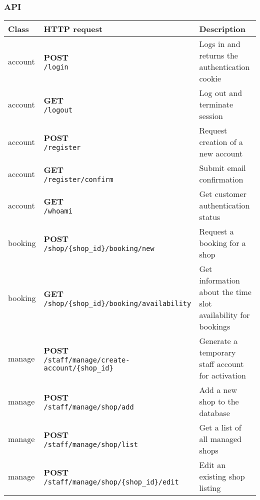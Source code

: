 \subsubsection{API}


\begin{tabularx}{\textwidth}{|p{}|l|X|} \hline
\textbf{Class} & \textbf{HTTP request} & \textbf{Description} \\\hline\endhead
account & \makecell{\textbf{POST} \\ \texttt{/login}}  & Logs in and returns the authentication  cookie \\\hline
account & \makecell{\textbf{GET} \\ \texttt{/logout}}  & Log out and terminate session \\\hline
account & \makecell{\textbf{POST} \\ \texttt{/register}}  & Request creation of a new account \\\hline
account & \makecell{\textbf{GET} \\ \texttt{/register/confirm}}  & Submit email confirmation \\\hline
account & \makecell{\textbf{GET} \\ \texttt{/whoami}}  & Get customer authentication status \\\hline
booking & \makecell{\textbf{POST} \\ \texttt{/shop/\{shop\_id\}/booking/new}}  & Request a booking for a shop \\\hline
booking & \makecell{\textbf{GET} \\ \texttt{/shop/\{shop\_id\}/booking/availability}}  & Get information about the time slot availability for bookings \\\hline
manage & \makecell{\textbf{POST} \\ \texttt{/staff/manage/create-account/\{shop\_id\}}}  & Generate a temporary staff account for activation \\\hline
manage & \makecell{\textbf{POST} \\ \texttt{/staff/manage/shop/add}}  & Add a new shop to the database \\\hline
manage & \makecell{\textbf{POST} \\ \texttt{/staff/manage/shop/list}}  & Get a list of all managed shops \\\hline
manage & \makecell{\textbf{POST} \\ \texttt{/staff/manage/shop/\{shop\_id\}/edit}}  & Edit an existing shop listing \\\hline

\end{tabularx}
